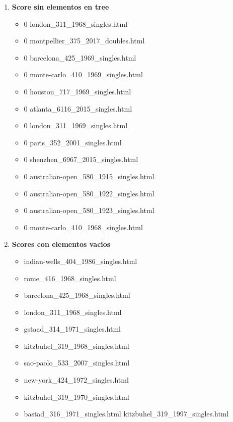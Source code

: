 \documentclass[a4paper,10pt]{article}
\begin{document}
\begin{enumerate}
\item \textbf{Score sin elementos en tree}
\begin{itemize}
 \item 0 london\_311\_1968\_singles.html 
 \item 0 montpellier\_375\_2017\_doubles.html
 \item 0 barcelona\_425\_1969\_singles.html
 \item 0 monte-carlo\_410\_1969\_singles.html
 \item 0 houston\_717\_1969\_singles.html
 \vspace{0.3cm}
 \item 0 atlanta\_6116\_2015\_singles.html
 \item 0 london\_311\_1969\_singles.html
 \item 0 paris\_352\_2001\_singles.html
 \item 0 shenzhen\_6967\_2015\_singles.html
 \item 0 australian-open\_580\_1915\_singles.html
 \item 0 australian-open\_580\_1922\_singles.html
 \item 0 australian-open\_580\_1923\_singles.html
 \item 0 monte-carlo\_410\_1968\_singles.html

\end{itemize} 

\item \textbf{Scores con elementos vacios}
\begin{itemize}
 \item indian-wells\_404\_1986\_singles.html
 \item rome\_416\_1968\_singles.html
 \item barcelona\_425\_1968\_singles.html
 \item london\_311\_1968\_singles.html
 \item gstaad\_314\_1971\_singles.html
 \item kitzbuhel\_319\_1968\_singles.html
 \item sao-paolo\_533\_2007\_singles.html
 \item new-york\_424\_1972\_singles.html
 \item kitzbuhel\_319\_1970\_singles.html
 \item bastad\_316\_1971\_singles.html
 kitzbuhel\_319\_1997\_singles.html

\end{itemize}


\end{enumerate}
\end{document}
